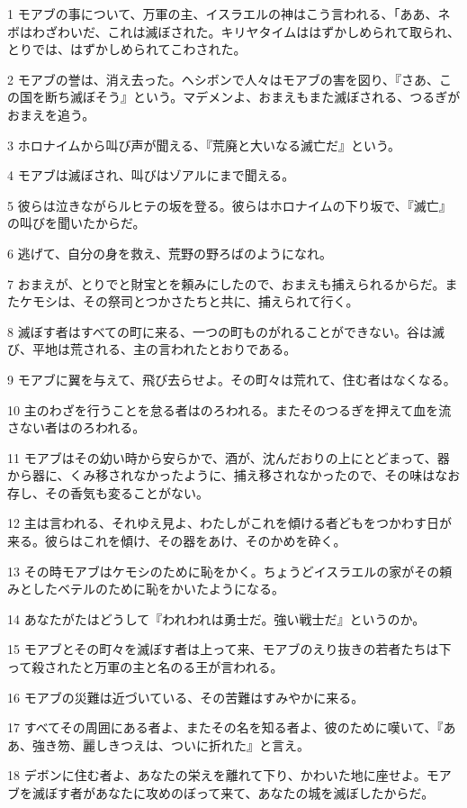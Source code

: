 \par 1 モアブの事について、万軍の主、イスラエルの神はこう言われる、「ああ、ネボはわざわいだ、これは滅ぼされた。キリヤタイムははずかしめられて取られ、とりでは、はずかしめられてこわされた。
\par 2 モアブの誉は、消え去った。ヘシボンで人々はモアブの害を図り、『さあ、この国を断ち滅ぼそう』という。マデメンよ、おまえもまた滅ぼされる、つるぎがおまえを追う。
\par 3 ホロナイムから叫び声が聞える、『荒廃と大いなる滅亡だ』という。
\par 4 モアブは滅ぼされ、叫びはゾアルにまで聞える。
\par 5 彼らは泣きながらルヒテの坂を登る。彼らはホロナイムの下り坂で、『滅亡』の叫びを聞いたからだ。
\par 6 逃げて、自分の身を救え、荒野の野ろばのようになれ。
\par 7 おまえが、とりでと財宝とを頼みにしたので、おまえも捕えられるからだ。またケモシは、その祭司とつかさたちと共に、捕えられて行く。
\par 8 滅ぼす者はすべての町に来る、一つの町ものがれることができない。谷は滅び、平地は荒される、主の言われたとおりである。
\par 9 モアブに翼を与えて、飛び去らせよ。その町々は荒れて、住む者はなくなる。
\par 10 主のわざを行うことを怠る者はのろわれる。またそのつるぎを押えて血を流さない者はのろわれる。
\par 11 モアブはその幼い時から安らかで、酒が、沈んだおりの上にとどまって、器から器に、くみ移されなかったように、捕え移されなかったので、その味はなお存し、その香気も変ることがない。
\par 12 主は言われる、それゆえ見よ、わたしがこれを傾ける者どもをつかわす日が来る。彼らはこれを傾け、その器をあけ、そのかめを砕く。
\par 13 その時モアブはケモシのために恥をかく。ちょうどイスラエルの家がその頼みとしたベテルのために恥をかいたようになる。
\par 14 あなたがたはどうして『われわれは勇士だ。強い戦士だ』というのか。
\par 15 モアブとその町々を滅ぼす者は上って来、モアブのえり抜きの若者たちは下って殺されたと万軍の主と名のる王が言われる。
\par 16 モアブの災難は近づいている、その苦難はすみやかに来る。
\par 17 すべてその周囲にある者よ、またその名を知る者よ、彼のために嘆いて、『ああ、強き笏、麗しきつえは、ついに折れた』と言え。
\par 18 デボンに住む者よ、あなたの栄えを離れて下り、かわいた地に座せよ。モアブを滅ぼす者があなたに攻めのぼって来て、あなたの城を滅ぼしたからだ。
